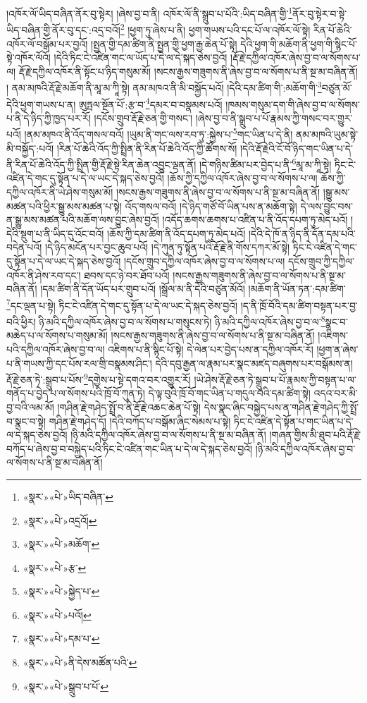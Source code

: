།འཁོར་ལོ་ཡིད་བཞིན་ནོར་བུ་སྟེར། །ཞེས་བྱ་བ་ནི། འཁོར་ལོ་ནི་སྒྲུབ་པ་པོའི་:ཡིད་བཞིན་གྱི་\footnote{«སྣར་»«པེ་»ཡིད་བཞིན་}ནོར་བུ་སྟེར་བ་སྟེ་ཡིད་བཞིན་གྱི་ནོར་བུ་དང་:འདྲ་བའོ།\footnote{«སྣར་»«པེ་»འདྲའོ།} །ཕྱག་ཏུ་ཞེས་པ་ནི། ཕྱག་གཡས་པའི་དང་པོ་ལ་འཁོར་ལོ་སྟེ། རིན་པོ་ཆེའི་འཁོར་ལོ་བསྒོམ་པར་བྱའོ། །སྤྱན་གྱི་དམ་ཚིག་ནི་སྤྱན་གྱི་ཕྱག་རྒྱ་ཆེན་པོ་སྟེ། དེའི་ཕྱག་གི་མཆོག་ནི་ཕྱག་གི་སྙིང་པོ་སྟེ་འཁོར་ལོའོ། །དེའི་ཏིང་ངེ་འཛིན་གང་ལ་ཡོད་པ་དེ་ལ་དེ་སྐད་ཅེས་བྱའོ། །རྡོ་རྗེ་དཀྱིལ་འཁོར་ཞེས་བྱ་བ་ལ་སོགས་པ་ལ། རྡོ་རྗེ་དཀྱིལ་འཁོར་ནི་སྟོང་པ་ཉིད་གསུམ་མོ། །སངས་རྒྱས་གཟུགས་ནི་ཞེས་བྱ་བ་ལ་སོགས་པ་ནི་སྔ་མ་བཞིན་ནོ། །
ནམ་མཁའི་རྡོ་རྗེ་མཆོག་ནི་མཱ་མ་ཀཱི་སྟེ། ནམ་མཁའ་ནི་མི་བསྐྱོད་པའོ། །དེའི་དམ་ཚིག་གི་:མཆོག་གི་\footnote{«སྣར་»«པེ་»མཆོག་}བཙུན་མོ་དེའི་ཕྱག་གཡས་པ་ན། ཨུཏྤལ་སྔོན་པོ་:རྩ་བ་\footnote{«སྣར་»«པེ་»རྩ་}དམར་བ་བསྣམས་པའོ། །ཁམས་གསུམ་དག་གི་ཞེས་བྱ་བ་ལ་སོགས་པ་ནི་དེ་ཉིད་ཀྱི་ཁྱད་པར་རོ། །དངོས་གྲུབ་རྡོ་རྗེ་ཅན་གྱི་གསང་། །ཞེས་བྱ་བ་ནི་སྒྲུབ་པ་པོ་རྣམས་ཀྱི་གསང་བར་གྱུར་པའོ། །ནམ་མཁའ་ནི་འོད་གསལ་བའོ། །ཡུམ་ནི་གང་ལས་རབ་ཏུ་:སྐྱེས་པ་\footnote{«སྣར་»«པེ་»སྐྱེད་པ་}གང་ཡིན་པ་དེ་ནི། ནམ་མཁའི་ཡུམ་སྟེ་མི་བསྐྱོད་:པའོ། །རིན་པོ་ཆེའི་འོད་ཀྱི་སྤྲིན་ནི་རིན་པོ་ཆེའི་འོད་ཀྱི་ཚོགས་སོ། །དེའི་རྡོ་རྗེའི་ངོ་བོ་ཉིད་གང་ཡིན་པ་དེ་ནི་རིན་པོ་ཆེའི་འོད་ཀྱི་སྤྲིན་གྱི་རྡོ་རྗེ་སྟེ་རིན་ཆེན་འབྱུང་ལྡན་ནོ། །དེ་གཉིས་ཚིམ་པར་བྱེད་པ་ནི་\footnote{«སྣར་»«པེ་»པའོ། }མཱ་མ་ཀཱི་སྟེ། ཏིང་ངེ་འཛིན་དེ་གང་དུ་སྟོན་པ་དེ་ལ་ཡང་དེ་སྐད་ཅེས་བྱའོ། །ཆོས་ཀྱི་དཀྱིལ་འཁོར་ཞེས་བྱ་བ་ལ་སོགས་པ་ལ། ཆོས་ཀྱི་དཀྱིལ་འཁོར་ནི་ཡེ་ཤེས་གསུམ་མོ། །སངས་རྒྱས་གཟུགས་ནི་ཞེས་བྱ་བ་ལ་སོགས་པ་ནི་སྔ་མ་བཞིན་ནོ། །སྒྱུ་མས་མཚན་པའི་ཕྱིར་སྒྱུ་མས་མཚན་པ་སྟེ། འོད་གསལ་བའོ། །དེ་ཉིད་གཙོ་བོ་ཡིན་པས་ན་མཆོག་སྟེ། དེ་ལས་བྱུང་བས་ན་སྒྱུ་མས་མཚན་པའི་མཆོག་ལས་བྱུང་ཞེས་བྱའོ། །འདོད་ཆགས་ཆགས་པ་འཛིན་པ་ནི་འོད་དཔག་ཏུ་མེད་པའོ། །དེའི་སྡུག་པ་ནི་ཡིད་དུ་འོང་བའོ། །ཆོས་ཀྱི་དམ་ཚིག་ནི་འོད་དཔག་ཏུ་མེད་པའོ། །དེའི་དེ་ཁོ་ན་ཉིད་ནི་དོན་དམ་པའི་བདེན་པའོ། །དེ་ཉིད་མངོན་པར་བྱང་ཆུབ་པའོ། །དེ་ཀུན་ཏུ་སྟོན་པའི་རྡོ་རྗེ་ནི་གོས་དཀར་མོ་སྟེ། ཏིང་ངེ་འཛིན་དེ་གང་དུ་སྟོན་པ་དེ་ལ་ཡང་དེ་སྐད་ཅེས་བྱའོ། །དངོས་གྲུབ་དཀྱིལ་འཁོར་ཞེས་བྱ་བ་ལ་སོགས་པ་ལ། དངོས་གྲུབ་ཀྱི་དཀྱིལ་འཁོར་ནི་ཤེས་རབ་དང་། ཐབས་དང་ཉེ་བར་ཐོབ་པའོ། །སངས་རྒྱས་གཟུགས་ནི་ཞེས་བྱ་བ་ལ་སོགས་པ་ནི་སྔ་མ་བཞིན་ནོ། །དམ་ཚིག་ནི་དོན་ཡོད་པར་གྲུབ་པའོ། །སྒྲོལ་མ་ནི་དེའི་བཙུན་མོའོ། །མཆོག་ནི་ཡོན་ཏན་:དམ་ཚིག་\footnote{«སྣར་»«པེ་»དམ་པ་}དང་ལྡན་པ་སྟེ། ཏིང་ངེ་འཛིན་དེ་གང་དུ་སྟོན་པ་དེ་ལ་ཡང་དེ་སྐད་ཅེས་བྱའོ། །ད་ནི་ཁྲོ་བོའི་དམ་ཚིག་བསྟན་པར་བྱ་བའི་ཕྱིར། ཉི་མའི་དཀྱིལ་འཁོར་ཞེས་བྱ་བ་ལ་སོགས་པ་གསུངས་ཏེ། ཉི་མའི་དཀྱིལ་འཁོར་ཞེས་བྱ་བ་ལ་\footnote{«སྣར་»«པེ་»ནི་དེས་མཚོན་པའི་}སྣང་བ་མཆེད་པ་ལ་སོགས་པ་གསུམ་མོ། །སངས་རྒྱས་གཟུགས་ནི་ཞེས་བྱ་བ་ལ་སོགས་པ་ནི་སྔ་མ་བཞིན་ནོ། །འཇིགས་པའི་དཀྱིལ་འཁོར་ཞེས་བྱ་བ་ལ། འཇིགས་པ་ནི་སྙིང་པོ་སྟེ། དེ་ལེན་པར་བྱེད་པས་ན་དཀྱིལ་འཁོར་རོ། །ཕྱག་ན་ཞེས་པ་ནི་གཡས་ཀྱི་དང་པོས་རལ་གྲི་བསྣམས་ཤིང་། དེའི་དབུ་རྒྱན་ལ་རྣམ་པར་སྣང་མཛད་བཞུགས་པར་བསྒོམས་ན། རྡོ་རྗེ་ཅན་ཏེ་:སྒྲུབ་པ་པོས་\footnote{«སྣར་»«པེ་»སྒྲུབ་པ་པོ་}དགྱེས་པ་སྟེ་དགའ་བར་འགྱུར་རོ། །ཡེ་ཤེས་རྡོ་རྗེ་ཅན་ཏེ་སྒྲུབ་པ་པོ་རྣམས་ཀྱི་བསྟན་པ་ལ་གནོད་པ་བྱེད་པ་ལ་སོགས་པའི་ཁྲོ་བོ་ཀུན་ཏེ། དེ་ལྟ་བུའི་ཁྲོ་བོ་གང་ཡིན་པ་གདུལ་བའི་དམ་ཚིག་སྟེ། འདའ་བར་མི་བྱ་བའི་ལམ་མོ། །གཤིན་རྗེ་གཤེད་སྤྲོ་བ་ནི་རྡོ་རྗེ་འཆང་ཆེན་པོ་སྟེ། དེས་སྣང་ཞིང་བསྐྱེད་པས་ན་གཤིན་རྗེ་གཤེད་ཀྱི་སྤྲོ་བ་སྣང་བ་སྟེ། གཤིན་རྗེ་གཤེད་དོ། །དེའི་བཀོད་པ་བསྒོམ་ཞིང་སེམས་པ་སྟེ། ཏིང་ངེ་འཛིན་དེ་སྟོན་པ་གང་ཡིན་པ་དེ་ལ་དེ་སྐད་ཅེས་བྱའོ། །ཉི་མའི་དཀྱིལ་འཁོར་ཞེས་བྱ་བ་ལ་སོགས་པ་ནི་སྔ་མ་བཞིན་ནོ། །གཞན་གྱིས་མི་ཐུབ་པའི་རྡོ་རྗེ་བཀོད་པ་ཞེས་བྱ་བ་བསྐྱེད་པའི་ཏིང་ངེ་འཛིན་གང་ཡིན་པ་དེ་ལ་དེ་སྐད་ཅེས་བྱའོ། །ཉི་མའི་དཀྱིལ་འཁོར་ཞེས་བྱ་བ་ལ་སོགས་པ་ནི་སྔ་མ་བཞིན་ནོ། 